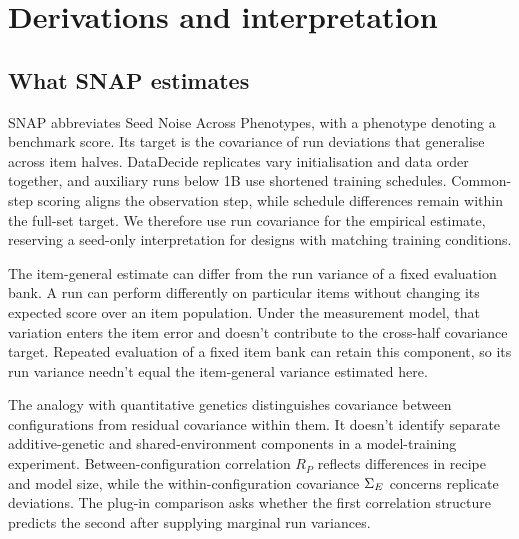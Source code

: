 \section{Derivations and interpretation}
\label{app:derivations}
\subsection{What SNAP estimates}
SNAP abbreviates Seed Noise Across Phenotypes, with a phenotype denoting a benchmark score. Its target is the covariance of run deviations that generalise across item halves. DataDecide replicates vary initialisation and data order together, and auxiliary runs below 1B use shortened training schedules. Common-step scoring aligns the observation step, while schedule differences remain within the full-set target. We therefore use run covariance for the empirical estimate, reserving a seed-only interpretation for designs with matching training conditions.

The item-general estimate can differ from the run variance of a fixed evaluation bank. A run can perform differently on particular items without changing its expected score over an item population. Under the measurement model, that variation enters the item error and doesn't contribute to the cross-half covariance target. Repeated evaluation of a fixed item bank can retain this component, so its run variance needn't equal the item-general variance estimated here.

The analogy with quantitative genetics distinguishes covariance between configurations from residual covariance within them. It doesn't identify separate additive-genetic and shared-environment components in a model-training experiment. Between-configuration correlation $R_P$ reflects differences in recipe and model size, while the within-configuration covariance $\Sigma_E$ concerns replicate deviations. The plug-in comparison asks whether the first correlation structure predicts the second after supplying marginal run variances.

